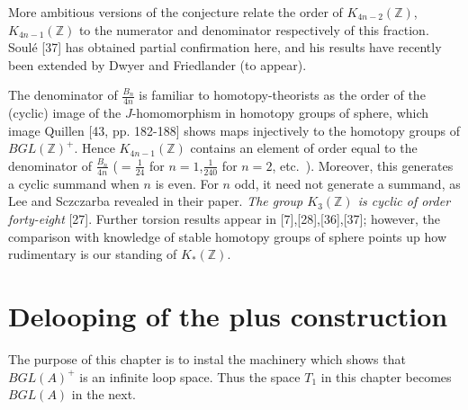 \documentclass[openany,leqno]{book}  %
\begin{document}
More ambitious versions of the conjecture relate the order of $K_{4n-2}(\mathbb{Z})$, $K_{4n-1}(\mathbb{Z})$ to the numerator and denominator respectively of this fraction. Soul\'{e} [37] has obtained partial confirmation here, and his results have recently been extended by Dwyer and Friedlander (to appear).

The denominator of $\frac{B_n}{4n}$ is familiar to homotopy-theorists as the order of the (cyclic) image of the $J$-homomorphism in homotopy groups of sphere, which image Quillen [43, pp. 182-188] shows maps injectively to the homotopy groups of $BGL(\mathbb{Z})^+$. Hence $K_{4n-1}(\mathbb{Z})$ contains an element of order equal to the denominator of $\frac{B_n}{4n}$ ($=\frac{1}{24}$ for $n=1$,$\frac{1}{240}$ for $n=2$, etc.\ ). Moreover, this generates a cyclic summand when $n$ is even. For $n$ odd, it need not generate a summand, as Lee and Sczczarba revealed in their paper. {\em The group $K_3(\mathbb{Z})$ is cyclic of order forty-eight} [27]. Further torsion results appear in [7],[28],[36],[37]; however, the comparison with knowledge of stable homotopy groups of sphere points up how rudimentary is our standing of $K_*(\mathbb{Z})$.


\chapter{Delooping of the plus construction} %
\label{cha:10delooping_of_the_plus_construction}
The purpose of this chapter is to instal the machinery which shows that $BGL(A)^+$ is an infinite loop space. Thus the space $T_1$ in this chapter becomes $BGL(A)$ in the next.
\end{document}
